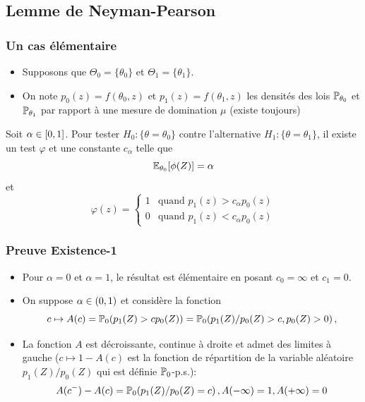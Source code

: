 \subsection{Lemme de Neyman-Pearson}

\begin{frame}
\frametitle{Un cas élémentaire}
\begin{itemize}
\item Supposons que $\Theta_0 = \{\theta_0\}$ et $\Theta_1=\{ \theta_1 \}$.
\item On note $p_0(z)= f(\theta_0,z)$ et $p_1(z)= f(\theta_1,z)$ les densités des lois $\operatorname{{\mathbb P}}_{\theta_0}$ et $\operatorname{{\mathbb P}}_{\theta_1}$ par rapport à une mesure de domination $\mu$ (existe toujours)
\end{itemize}
\begin{theo}
 Soit $\alpha \in \left[0,1\right]$. Pour tester $H_0: \{\theta = \theta_0\}$ contre l'alternative $H_1 : \{\theta = \theta_1\}$, il existe un test $\varphi$ et une constante $c_\alpha$ telle que
$$
\operatorname{{\mathbb E}}_{\theta_0}[\phi(Z)]= \alpha
$$
et
\[
\varphi(z)=
\begin{cases}
1 & \text{quand $p_1(z) > c_\alpha p_0(z)$} \\
0 & \text{quand $p_1(z) < c_\alpha p_0(z)$}
\end{cases}
\]
\end{theo}
\end{frame}

\begin{frame}
\frametitle{Preuve Existence-1}
\begin{itemize}
\item Pour $\alpha=0$ et $\alpha=1$, le résultat est élémentaire en posant $c_0=\infty$ et $c_1=0$.
\item On suppose $\alpha \in \left(0,1\right)$ et considère la fonction
$$
c \mapsto A(c)= \operatorname{{\mathbb P}}_0( p_1(Z) > c p_0(Z)) = \operatorname{{\mathbb P}}_0( p_1(Z)/p_0(Z) > c , p_0(Z) > 0) \,,
$$
\item La fonction $A$ est  décroissante, continue à droite et admet des limites à gauche ($c \mapsto 1 - A(c)$ est la fonction de répartition de
la variable aléatoire $p_1(Z)/p_0(Z)$ qui est définie $\operatorname{{\mathbb P}}_0$-p.s.):
$$
A(c^-) - A(c) = \operatorname{{\mathbb P}}_0( p_1(Z)/p_0(Z) = c) \,, A(-\infty)= 1, A(+\infty)=0
$$
\end{itemize}
\end{frame}

